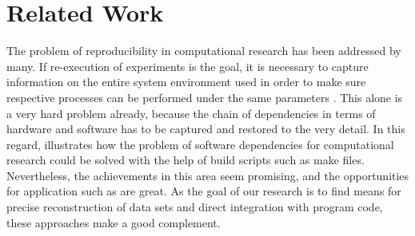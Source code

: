 \documentclass{sig-alternate}
\begin{document}
\section{Related Work}\label{sec:relatedwork}



The problem of reproducibility in computational research has been addressed by many.
If re-execution of experiments is the goal, it is necessary to capture information on the entire system environment used in order to make sure respective processes can be performed under the same parameters
%
%
%
\cite{DBLP_conf_ercimdl_Rauber12}
\cite{Rechert_2010_EBS_1816123_1816182}
.
This alone is a very hard problem already, because the chain of dependencies in terms of hardware and software has to be captured and restored to the very detail.
In this regard, \cite{Schwab_2000_MSC_369545_369555} illustrates how the problem of software dependencies for computational research could be solved with the help of build scripts such as make files.
Nevertheless, the achievements in this area seem promising, and the opportunities for application such as  
%
%
%
\cite{Nowakowski2011608} %
%
are great. %
As the goal of our research is to find means for precise reconstruction of data sets and direct integration with program code, these approaches make a good complement. %
\end{document}
